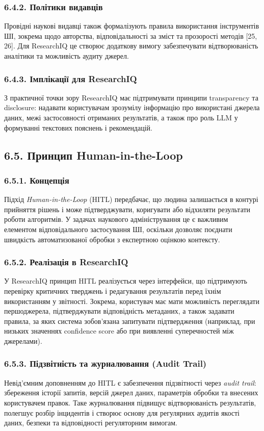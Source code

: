 \subsubsection*{6.4.2. Політики видавців}

Провідні наукові видавці також формалізують правила використання інструментів ШІ, зокрема щодо авторства, відповідальності за зміст та прозорості методів [25, 26]. Для ResearchIQ це створює додаткову вимогу забезпечувати відтворюваність аналітики та можливість аудиту джерел.

\subsubsection*{6.4.3. Імплікації для ResearchIQ}

З практичної точки зору ResearchIQ має підтримувати принципи transparency та disclosure: надавати користувачам зрозумілу інформацію про використані джерела даних, межі застосовності отриманих результатів, а також про роль LLM у формуванні текстових пояснень і рекомендацій.

\subsection*{6.5. Принцип Human-in-the-Loop}

\subsubsection*{6.5.1. Концепція}

Підхід \emph{Human-in-the-Loop} (HITL) передбачає, що людина залишається в контурі прийняття рішень і може підтверджувати, коригувати або відхиляти результати роботи алгоритмів. У задачах наукового адміністрування це є важливим елементом відповідального застосування ШІ, оскільки дозволяє поєднати швидкість автоматизованої обробки з експертною оцінкою контексту.

\subsubsection*{6.5.2. Реалізація в ResearchIQ}

У ResearchIQ принцип HITL реалізується через інтерфейси, що підтримують перевірку критичних тверджень і редагування результатів перед їхнім використанням у звітності. Зокрема, користувач має мати можливість переглядати першоджерела, підтверджувати відповідність метаданих, а також задавати правила, за яких система зобов'язана запитувати підтвердження (наприклад, при низьких значеннях confidence score або при виявленні суперечностей між джерелами).

\subsubsection*{6.5.3. Підзвітність та журналювання (Audit Trail)}

Невід'ємним доповненням до HITL є забезпечення підзвітності через \emph{audit trail}: збереження історії запитів, версій джерел даних, параметрів обробки та внесених користувачем правок. Таке журналювання підвищує відтворюваність результатів, полегшує розбір інцидентів і створює основу для регулярних аудитів якості даних, безпеки та відповідності регуляторним вимогам.